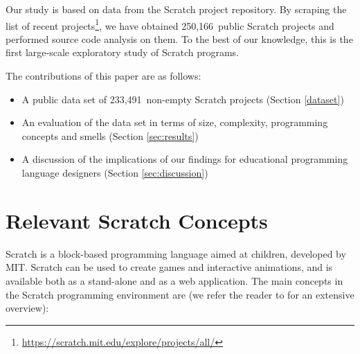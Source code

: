 \documentclass{sig-alternate-05-2015}
\newcommand{\nPrograms}{250,166}
\newcommand{\nScriptPrograms}{233,491}
\begin{document}
Our study is based on data from the Scratch project repository. By scraping the list of recent projects\footnote{\label{scratchpublic}\url{https://scratch.mit.edu/explore/projects/all/}}, we have obtained \nPrograms~public Scratch projects and performed source code analysis on them. To the best of our knowledge, this is the first large-scale exploratory study of Scratch programs.

The contributions of this paper are as follows:

\begin{itemize}
	\item{A public data set of \nScriptPrograms~non-empty Scratch projects (Section \ref{dataset})}
	\item{An evaluation of the data set in terms of size, complexity, programming concepts and smells (Section \ref{sec:results})}
	\item{A discussion of the implications of our findings for educational programming language designers (Section \ref{sec:discussion})}
\end{itemize}

\section{Relevant Scratch Concepts}
\label{sec:scratch}
Scratch is a block-based programming language aimed at children, developed by MIT. Scratch can be used to create games and interactive animations, and is available both as a stand-alone and as a web application. The main concepts in the Scratch programming environment are (we refer the reader to \cite{brennan_creative_2014} for an extensive overview):
\end{document}

